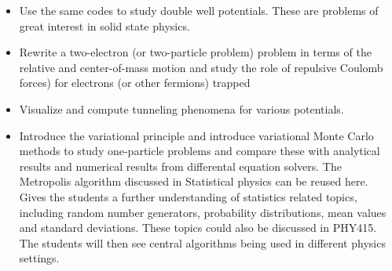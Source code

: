 \documentclass[graybox,envcountchap,sectrefs]{svmult}
\begin{document}
\begin{itemize}
\item Use the same codes to study double well potentials. These are problems of great interest in solid state physics.

\item Rewrite a two-electron (or two-particle problem) problem in terms of the relative and center-of-mass motion and study the role of repulsive Coulomb forces) for electrons (or other fermions) trapped

\item Visualize and compute tunneling phenomena for various potentials.

\item Introduce the  variational principle and introduce variational Monte Carlo methods to study one-particle problems and compare these with analytical results and numerical results from differental equation solvers.  The Metropolis algorithm discussed in Statistical physics can be reused here. Gives the students a further understanding of statistics related topics, including random number generators, probability distributions, mean values and standard deviations. These topics could also be discussed in PHY415. The students will then see central algorithms being used in different physics settings.
\end{itemize}

\noindent
\end{document}
